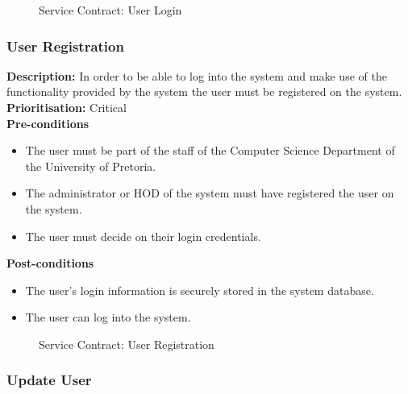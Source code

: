 \documentclass[a4paper]{article}
\begin{document}
            	\begin{figure}[H]
            		\centering
            		\caption{Service Contract: User Login}
            	\end{figure}
        
        \pagebreak
    \subsubsection{User Registration}
        
        \textbf{Description:}  In order to be able to log into the system and make use of the functionality provided by the system the user must be registered on the system. \\
        \textbf{Prioritisation:} Critical\\
       
        \textbf{Pre-conditions}
         \begin{itemize}
            \item The user must be part of the staff of the Computer Science Department of the University of Pretoria.
            \item The administrator or HOD of the system must have registered the user on the system.
            \item The user must decide on their login credentials.
       \end{itemize}
        
        \textbf{Post-conditions}
        \begin{itemize}
            \item The user's login information is securely stored in the system database.
            \item The user can log into the system.
        \end{itemize}
        
        	\begin{figure}[H]
        		\centering
        		\caption{Service Contract: User Registration}
        	\end{figure}
        
        
        \pagebreak
    \subsubsection{Update User}
       
\end{document}
